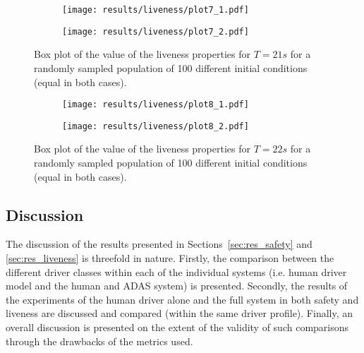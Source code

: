 \begin{figure}[H]
\centering
\begin{subfigure}{0.49\textwidth}
  \centering
  \texttt{[image: results/liveness/plot7\_1.pdf]}
\end{subfigure}
\begin{subfigure}{0.49\textwidth}
  \centering
  \texttt{[image: results/liveness/plot7\_2.pdf]}
\end{subfigure} 
\caption{Box plot of the value of the liveness properties for $T = 21s$ for a randomly sampled population of 100 different initial conditions (equal in both cases).}
\label{fig:plot7}
\end{figure}

\begin{figure}[H]
\centering
\begin{subfigure}{0.49\textwidth}
  \centering
  \texttt{[image: results/liveness/plot8\_1.pdf]}
\end{subfigure}
\begin{subfigure}{0.49\textwidth}
  \centering
  \texttt{[image: results/liveness/plot8\_2.pdf]}
\end{subfigure} 
\caption{Box plot of the value of the liveness properties for $T = 22s$ for a randomly sampled population of 100 different initial conditions (equal in both cases).}
\label{fig:plot8}
\end{figure}

\subsection{Discussion}

The discussion of the results presented in Sections~\ref{sec:res_safety} and \ref{sec:res_liveness} is threefold in nature. Firstly, the comparison between the different driver classes within each of the individual systems (i.e. human driver model and the human and ADAS system) is presented. Secondly, the results of the experiments of the human driver alone and the full system in both safety and liveness are discussed and compared (within the same driver profile). Finally, an overall discussion is presented on the extent of the validity of such comparisons through the drawbacks of the metrics used.

